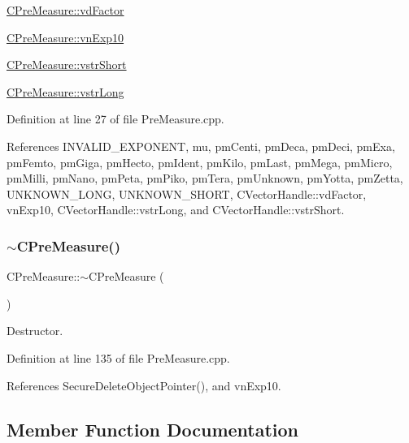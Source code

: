 \begin{DoxyItemize}
\item \hyperlink{classCVectorHandle_af8f8b2e0da8363e695872ca85f33364e}{C\+Pre\+Measure\+::vd\+Factor}
\item \hyperlink{classCPreMeasure_a2c50eadae55427f0d77a013b3fab0fdb}{C\+Pre\+Measure\+::vn\+Exp10}
\item \hyperlink{classCVectorHandle_afb50c8a33d4cf70bf92c644dca409ea2}{C\+Pre\+Measure\+::vstr\+Short}
\item \hyperlink{classCVectorHandle_a71bec0e385b9ca8e5ffa174b559da9f8}{C\+Pre\+Measure\+::vstr\+Long} 
\end{DoxyItemize}

Definition at line 27 of file Pre\+Measure.\+cpp.



References I\+N\+V\+A\+L\+I\+D\+\_\+\+E\+X\+P\+O\+N\+E\+NT, mu, pm\+Centi, pm\+Deca, pm\+Deci, pm\+Exa, pm\+Femto, pm\+Giga, pm\+Hecto, pm\+Ident, pm\+Kilo, pm\+Last, pm\+Mega, pm\+Micro, pm\+Milli, pm\+Nano, pm\+Peta, pm\+Piko, pm\+Tera, pm\+Unknown, pm\+Yotta, pm\+Zetta, U\+N\+K\+N\+O\+W\+N\+\_\+\+L\+O\+NG, U\+N\+K\+N\+O\+W\+N\+\_\+\+S\+H\+O\+RT, C\+Vector\+Handle\+::vd\+Factor, vn\+Exp10, C\+Vector\+Handle\+::vstr\+Long, and C\+Vector\+Handle\+::vstr\+Short.

\mbox{\label{classCPreMeasure_ab927f07495fc7757c1488010f4440bc0}} 
\subsubsection{\texorpdfstring{$\sim$\+C\+Pre\+Measure()}{~CPreMeasure()}}
{\footnotesize\ttfamily C\+Pre\+Measure\+::$\sim$\+C\+Pre\+Measure (\begin{DoxyParamCaption}{ }\end{DoxyParamCaption})}



Destructor. 



Definition at line 135 of file Pre\+Measure.\+cpp.



References Secure\+Delete\+Object\+Pointer(), and vn\+Exp10.



\subsection{Member Function Documentation}
\mbox{\label{classCPreMeasure_aa097540f3c74a3c616dee8ed1e120489}} 
